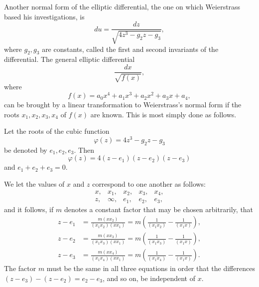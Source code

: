 \documentclass[11pt]{article}
\begin{document}
Another normal form of the elliptic differential, the one on which Weierstrass based his investigations, is
\begin{equation}
du=\frac{dz}{\sqrt{4z^3-g_2z-g_3}},
\tag{1}
\end{equation}
where $g_2,g_3$ are constants, called the first and second invariants of the differential. The general elliptic differential
\begin{equation}
\frac{dx}{\sqrt{f(x)}},
\tag{2}
\end{equation}
where
\begin{equation}
f(x)=a_0x^4+a_1x^3+a_2x^2+a_3x+a_4,
\tag{3}
\end{equation}
can be brought by a linear transformation to Weierstrass's normal form if the roots $x_1,x_2,x_3,x_4$ of $f(x)$ are known. This is most simply done as follows.

Let the roots of the cubic function
\[
\varphi(z)=4z^3-g_2z-g_3
\]
be denoted by $e_1,e_2,e_3$. Then
\[
\varphi(z)=4(z-e_1)(z-e_2)(z-e_3)
\]
and $e_1+e_2+e_3=0$.

We let the values of $x$ and $z$ correspond to one another as follows:
\[
\begin{array}{ccccc}
x,&x_1,&x_2,&x_3,&x_4,\\
z,&\infty,&e_1,&e_2,&e_3,
\end{array}
\]
and it follows, if $m$ denotes a constant factor that may be chosen arbitrarily, that
\begin{equation}
\begin{aligned}
z-e_1&=\frac{m(xx_2)}{(x_1x_2)(xx_1)}=m\left(\frac1{(x_1x_2)}-\frac1{(x_1x)}\right),\\
z-e_2&=\frac{m(xx_3)}{(x_1x_3)(xx_1)}=m\left(\frac1{(x_1x_3)}-\frac1{(x_1x)}\right),\\
z-e_3&=\frac{m(xx_4)}{(x_1x_4)(xx_1)}=m\left(\frac1{(x_1x_4)}-\frac1{(x_1x)}\right).
\end{aligned}
\tag{4}
\end{equation}
The factor $m$ must be the same in all three equations in order that the differences $(z-e_3)-(z-e_2)=e_2-e_3$, and so on, be independent of $x$.
\end{document}
